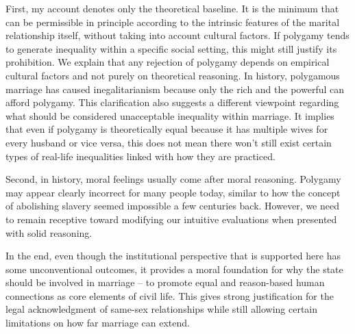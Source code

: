 \documentclass[man,floatsintext]{apa7}
\begin{document}
First, my account denotes only the theoretical baseline. It is the minimum that can be permissible in principle according to the intrinsic features of the marital relationship itself, without taking into account cultural factors. If polygamy tends to generate inequality within a specific social setting, this might still justify its prohibition. We explain that any rejection of polygamy depends on empirical cultural factors and not purely on theoretical reasoning. In history, polygamous marriage has caused inegalitarianism because only the rich and the powerful can afford polygamy. This clarification also suggests a different viewpoint regarding what should be considered unacceptable inequality within marriage. It implies that even if polygamy is theoretically equal because it has multiple wives for every husband or vice versa, this does not mean there won't still exist certain types of real-life inequalities linked with how they are practiced.

Second, in history, moral feelings usually come after moral reasoning. Polygamy may appear clearly incorrect for many people today, similar to how the concept of abolishing slavery seemed impossible a few centuries back. However, we need to remain receptive toward modifying our intuitive evaluations when presented with solid reasoning.

In the end, even though the institutional perspective that is supported here has some unconventional outcomes, it provides a moral foundation for why the state should be involved in marriage -- to promote equal and reason-based human connections as core elements of civil life. This gives strong justification for the legal acknowledgment of same-sex relationships while still allowing certain limitations on how far marriage can extend.


\printbibliography{}
\end{document}
